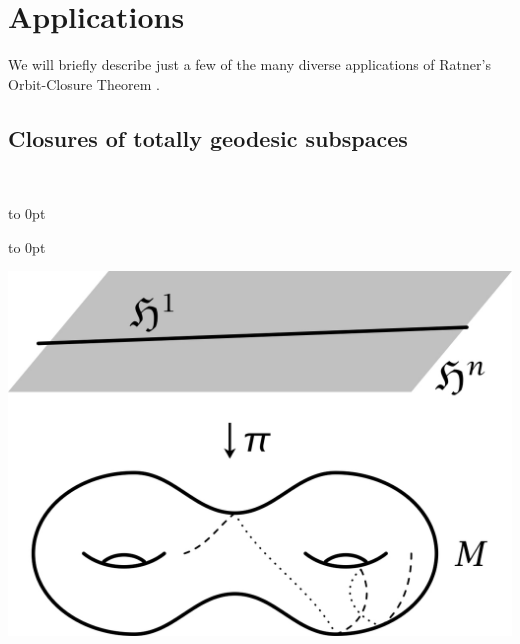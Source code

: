 \section{Applications} \label{RatnerApplsSect}

We will briefly describe just a few of the many diverse applications of Ratner's Orbit-Closure Theorem .


\subsection{Closures of totally geodesic subspaces} \ 

\noindent \begin{minipage}{2.6in}
\hbox to 0pt{\hskip 2.65in\vbox to 0pt{
\begin{minipage}{2in}
\vskip 0.1in
\includegraphics{PDF/H3cover.jpg}\hss
%
%
%
%

\end{minipage}}}
\end{minipage}
